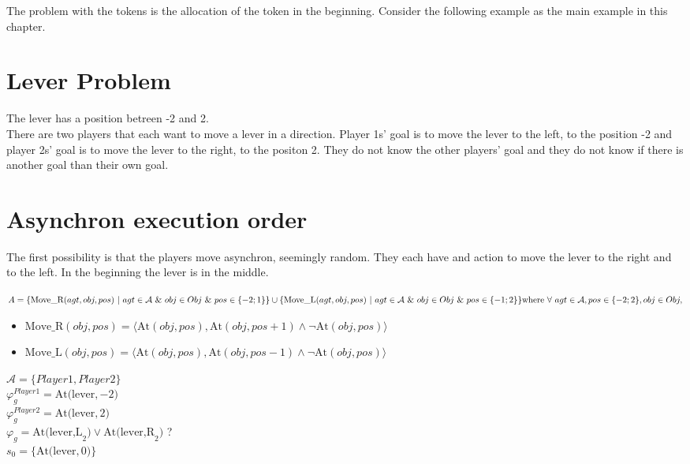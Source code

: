 \newpage

The problem with the tokens is the allocation of the token in the beginning. Consider the following example as the main example in this chapter.


\section{Lever Problem}
  The lever has a position betreen -2 and 2.\\
  There are two players that each want to move a lever in a direction. Player 1s' goal is to move the lever to the left, to the position -2 and player 2s' goal is to move the lever to the right, to the positon 2. They do not know the other players' goal and they do not know if there is another goal than their own goal.

\section{Asynchron execution order}
  The first possibility is that the players move asynchron, seemingly random. They each have and action to move the lever to the right and to the left. In the beginning the lever is in the middle.

  $
  A=
  \{\text{Move\_R}(agt,obj,pos) \ | \ agt \in \mathcal{A} \ \& \ obj \in Obj \ \& \ pos \in \{ -2;1\}\} \cup \\
  \{\text{Move\_L}(agt,obj,pos) \ | \ agt \in \mathcal{A} \ \& \ obj \in Obj \ \& \ pos \in \{ -1;2\}\} \\
  \text{where} \ \forall \ agt \in \mathcal{A}, pos \in \{ -2;2\}, obj \in Obj ,
  $
  \begin{itemize}
    \item $
      \text{Move\_R}(obj,pos) = \langle \text{At}(obj, pos) , \text{At}(obj, pos+1) \wedge \neg \text{At}(obj,pos) \rangle
      $
    \item $
      \text{Move\_L}(obj,pos) = \langle \text{At}(obj, pos) , \text{At}(obj, pos-1) \wedge \neg \text{At}(obj,pos) \rangle
      $
  \end{itemize}
  $\mathcal{A}= \{Player1, Player2\}$ \\
  $\varphi^{Player1}_g = \text{At(lever},-2)$  \\
  $\varphi^{Player2}_g = \text{At(lever},2)$ \\
  $\varphi_g = \text{At(lever,L}_2) \vee \text{At(lever,R}_2)$ ? \\
  $s_0 = \{\text{At(lever}, 0) \}$

